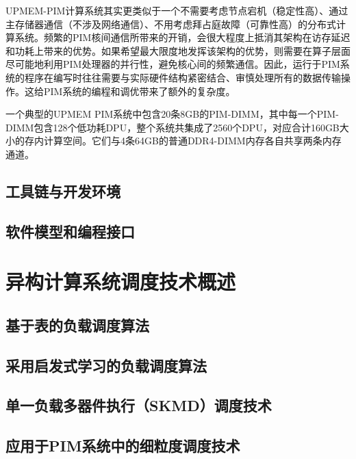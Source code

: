         UPMEM-PIM计算系统其实更类似于一个不需要考虑节点宕机（稳定性高）、通过主存储器通信（不涉及网络通信）、不用考虑拜占庭故障（可靠性高）的分布式计算系统\citep{chen_simplepim_2023}。频繁的PIM核间通信所带来的开销，会很大程度上抵消其架构在访存延迟和功耗上带来的优势。如果希望最大限度地发挥该架构的优势，则需要在算子层面尽可能地利用PIM处理器的并行性，避免核心间的频繁通信\citep{gomez-luna_benchmarking_2021}。因此，运行于PIM系统的程序在编写时往往需要与实际硬件结构紧密结合、审慎处理所有的数据传输操作。这给PIM系统的编程和调优带来了额外的复杂度\citep{chen_simplepim_2023}。
        
        一个典型的UPMEM PIM系统中包含20条8GB的PIM-DIMM，其中每一个PIM-DIMM包含128个低功耗DPU，整个系统共集成了2560个DPU，对应合计160GB大小的存内计算空间。它们与4条64GB的普通DDR4-DIMM内存各自共享两条内存通道。

        \subsection{工具链与开发环境}\label{subsubsec:UPMEM_toolchain_arch}

        \subsection{软件模型和编程接口}\label{subsubsec:UPMEM_software_model_and_interface}
\section{异构计算系统调度技术概述}\label{sec:brief_intro_of_heterogenous_scheduling}
    \subsection{基于表的负载调度算法}\label{subsec:list_schedule_algorithm_intro}
    \subsection{采用启发式学习的负载调度算法}\label{subsec:heuristic_based_scheduling_intro}
    \subsection{单一负载多器件执行（SKMD）调度技术}\label{subsec:SKMD_intro}
    \subsection{应用于PIM系统中的细粒度调度技术}\label{subsec:fine_grained_PIM_schedule_intro}

